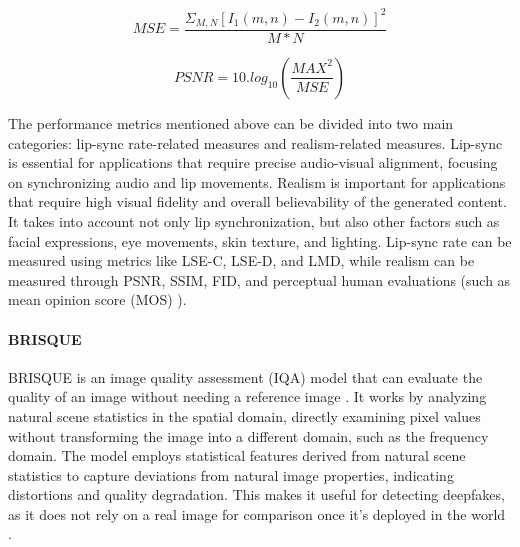 \begin{equation}
    MSE = \frac{\Sigma_{M,N}[I_1(m,n)-I_2(m,n)]^2}{M*N}
    \label{eq:multimodal_psnr}
\end{equation}

\begin{equation}
    PSNR = 10.log_{10} (\frac{MAX^2}{MSE})
    \label{eq:multimodal_psnr}
\end{equation}



The performance metrics mentioned above can be divided into two main categories: lip-sync rate-related measures and realism-related measures. Lip-sync is essential for applications that require precise audio-visual alignment, focusing on synchronizing audio and lip movements. Realism is important for applications that require high visual fidelity and overall believability of the generated content. It takes into account not only lip synchronization, but also other factors such as facial expressions, eye movements, skin texture, and lighting. Lip-sync rate can be measured using metrics like LSE-C, LSE-D, and LMD, while realism can be measured through PSNR, SSIM, FID, and perceptual human evaluations (such as mean opinion score (MOS) \cite{lu2022visualtts, hou2024polyglotfake}).

\paragraph{BRISQUE}

BRISQUE is an image quality assessment (IQA) model that can evaluate the quality of an image without needing a reference image \cite{mittal2012no}. It works by analyzing natural scene statistics in the spatial domain, directly examining pixel values without transforming the image into a different domain, such as the frequency domain. The model employs statistical features derived from natural scene statistics to capture deviations from natural image properties, indicating distortions and quality degradation. This makes it useful for detecting deepfakes, as it does not rely on a real image for comparison once it's deployed in the world \cite{hou2024polyglotfake, yang2020deepfake}. 


